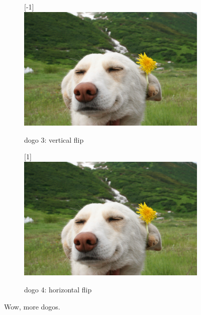 \documentclass[12pt, a4paper, oneside]{article}
\begin{document}
\begin{figure}[h]
\begin{subfigure}[b]{0.4\textwidth}
        \scalebox{1}[-1]{\includegraphics[trim={0.9cm 0cm 0.9cm 0.73cm}, clip, width=\textwidth]{dog}}
        \caption{dogo 3: vertical flip}
    \end{subfigure}
    \hspace{6mm}
    \begin{subfigure}[b]{0.4\textwidth}
        \scalebox{-1}[1]{\includegraphics[trim={0.9cm 0cm 0.9cm 0.73cm}, clip, width=\textwidth]{dog}}
        \caption{dogo 4: horizontal flip}
    \end{subfigure}
    \caption[More dogs]{Wow, more dogos.}
    \label{fig:dogos}
\end{figure}
\end{document}
